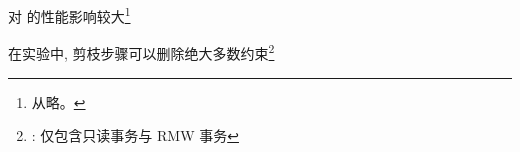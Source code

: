 \begin{frame}{}
	\begin{center}
		 对 \polysi{} 的性能影响较大\footnote{
			 从略。
		}

		\vspace{0.30cm}
	\end{center}
\end{frame}

\begin{frame}{}
	\begin{center}
		在实验中, 剪枝步骤可以删除绝大多数约束\footnote{
			: 仅包含只读事务与 RMW 事务
		}

		\vspace{0.30cm}
		
	\end{center}
\end{frame}
